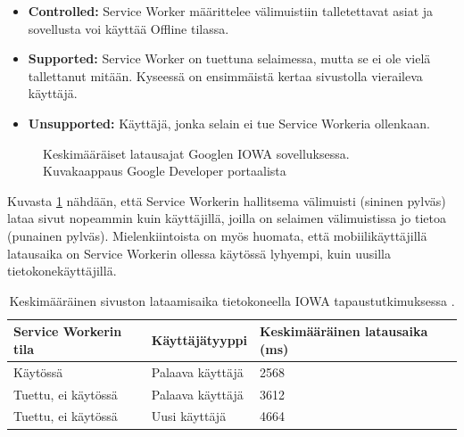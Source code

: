 \documentclass{tktltiki}
\begin{document}
\begin{itemize}
  \item \textbf{Controlled:} Service Worker määrittelee välimuistiin talletettavat asiat ja sovellusta voi käyttää Offline tilassa.
  \item \textbf{Supported:} Service Worker on tuettuna selaimessa, mutta se ei ole vielä tallettanut mitään. Kyseessä on ensimmäistä kertaa sivustolla vieraileva käyttäjä.
  \item \textbf{Unsupported:} Käyttäjä, jonka selain ei tue Service Workeria ollenkaan. 
\end{itemize}

\begin{figure}[h]
\begin{center}
\caption{Keskimääräiset latausajat Googlen IOWA sovelluksessa. Kuvakaappaus Google Developer portaalista \cite{Walton}}
\label{Google AVG load times}
\end{center}
\end{figure}

Kuvasta \ref{Google AVG load times} nähdään, että Service Workerin hallitsema välimuisti (sininen pylväs) lataa sivut nopeammin kuin käyttäjillä, joilla on selaimen välimuistissa jo tietoa (punainen pylväs). Mielenkiintoista on myös huomata, että mobiilikäyttäjillä latausaika on Service Workerin ollessa käytössä lyhyempi, kuin uusilla tietokonekäyttäjillä. 

\begin{table}[h]
\centering
\begin{small}
\caption{Keskimääräinen sivuston lataamisaika tietokoneella IOWA tapaustutkimuksessa \cite{Walton}. }
\begin{tabular}{|L{5cm}|L{4cm}|L{4cm}|}
\hline
\textbf{Service Workerin tila} & 
\textbf{Käyttäjätyyppi} &
\textbf{Keskimääräinen latausaika (ms)}
\\ \hline
Käytössä & 
Palaava käyttäjä &
2568
\\ \hline
Tuettu, ei käytössä & 
Palaava käyttäjä &
3612
\\ \hline
Tuettu, ei käytössä & 
Uusi käyttäjä &
4664
\\ \hline
\end{tabular}
\label{table:loading time on pc}
\end{small}
\end{table}

\clearpage
\end{document}
